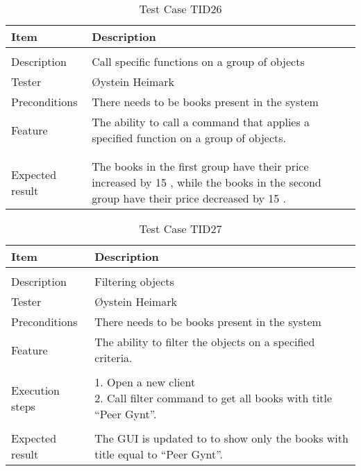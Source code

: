 \begin{table}[H]
\caption{Test Case TID26}
\centering
\begin{tabular}{ l p{13cm} }
\hline 
 Item            & Description        \\ 
\hline \\ [-2.0ex]
 Description     & Call specific functions on a group of objects \\ 
 Tester          & Øystein Heimark                  \\ 
 Preconditions   & There needs to be books present in the system\\ 
 Feature         & The ability to call a command that applies a specified function on a group of objects.   \vspace{3pt}                     \\ 
\hline \\ [-1.5ex]
\hline \\ [-1.5ex]
 Expected result & The books in the first group have their price increased by
 15 , while the books in the second group have their price decreased by 15 .
 \\
\hline 
\end{tabular}
\label{table:testcasetid26}
\end{table}


\begin{table}[H]
\caption{Test Case TID27}
\centering
\begin{tabular}{ l p{13cm} }
\hline 
 Item            & Description        \\ 
\hline \\ [-2.0ex]
 Description     & Filtering objects \\ 
 Tester          & Øystein Heimark                  \\ 
 Preconditions   & There needs to be books present in the system\\ 
 Feature         & The ability to filter the objects on a specified criteria.   \vspace{3pt}                     \\ 
\hline \\ [-1.5ex]
 Execution steps & \pbox{13cm}{1. Open a new client \\ 2. Call filter command to get all books with title “Peer Gynt”. } \vspace{3pt} \\
\hline \\ [-1.5ex]
 Expected result & The GUI is updated to to show only the books with title equal to “Peer Gynt”. \\
\hline 
\end{tabular}
\label{table:testcasetid27}
\end{table}


